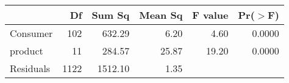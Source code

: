 \begin{tabular}{lrrrrr}
  \hline
 & Df & Sum Sq & Mean Sq & F value & Pr($>$F) \\ 
  \hline
Consumer & 102 & 632.29 & 6.20 & 4.60 & 0.0000 \\ 
  product & 11 & 284.57 & 25.87 & 19.20 & 0.0000 \\ 
  Residuals & 1122 & 1512.10 & 1.35 &  &  \\ 
   \hline
\end{tabular}
